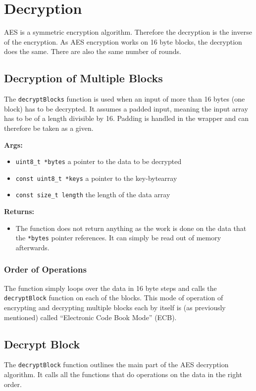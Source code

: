 \section{Decryption}
\label{ch:decryption}

AES is a symmetric encryption algorithm. Therefore the decryption is the inverse of the encryption. As AES encryption works on 16 byte blocks, the decryption does the same. There are also the same number of rounds.

\subsection{Decryption of Multiple Blocks}
\label{ch:dec_multipleblocks}
The \lstinline|decryptBlocks| function is used when an input of more than 16 bytes (one block) has to be decrypted. It assumes a padded input, meaning the input array has to be of a length divisible by 16. Padding is handled in the wrapper and can therefore be taken as a given.

\textbf{Args:}
\begin{itemize}
  \item \lstinline{uint8_t *bytes} a pointer to the data to be decrypted
  \item \lstinline{const uint8_t *keys} a pointer to the key-bytearray
  \item \lstinline{const size_t length} the length of the data array
\end{itemize}

\textbf{Returns:}
\begin{itemize}
  \item The function does not return anything as the work is done on the data that the \lstinline{*bytes} pointer references. It can simply be read out of memory afterwards.
\end{itemize}

\subsubsection{Order of Operations}
The function simply loops over the data in 16 byte steps and calls the \lstinline{decryptBlock} function on each of the blocks. This mode of operation of encrypting and decrypting multiple blocks each by itself is (as previously mentioned) called \enquote{Electronic Code Book Mode} (ECB). 

\subsection{Decrypt Block}
\label{ch:dec_block}
The \lstinline{decryptBlock} function outlines the main part of the AES decryption algorithm. It calls all the functions that do operations on the data in the right order.


